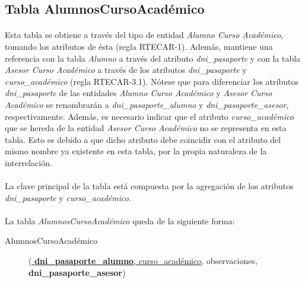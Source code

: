    \subsection{Tabla AlumnosCursoAcadémico}

      \paragraph{}Esta tabla se obtiene a través del tipo de entidad
      \textit{Alumno Curso Académico}, tomando los atributos de ésta (regla
      RTECAR-1). Además, mantiene una referencia con la tabla \textit{Alumno} a
      través del atributo \textit{dni\_pasaporte} y con la
      tabla \textit{Asesor Curso Académico} a través de los atributos
      \textit{dni\_pasaporte} y \textit{curso\_académico} (regla RTECAR-3.1).
      Nótese que para diferenciar los atributos \textit{dni\_pasaporte} de las
      entidades \textit{Alumno Curso Académico} y \textit{Asesor Curso
      Académico} se renombrarán a \textit{dni\_pasaporte\_alumno} y
      \textit{dni\_pasaporte\_asesor}, respectivamente. Además, es necesario
      indicar que el atributo \textit{curso\_académico} que se hereda de la
      entidad \textit{Asesor Curso Académico} no se representa en esta tabla.
      Esto es debido a que dicho atributo debe coincidir con el atributo del
      mismo nombre ya existente en esta tabla, por la propia naturaleza de la
      interrelación.

      \paragraph{}La clave principal de la tabla está compuesta por la
      agregación de los atributos \textit{dni\_pasaporte} y
      \textit{curso\_académico}.

      \paragraph{}La tabla \textit{AlumnosCursoAcadémico} queda de la siguiente
      forma:

      \begin{description}
         \item[AlumnosCursoAcadémico] \begin{flushleft}(\underline{
         \textbf{dni\_pasaporte\_alumno}, curso\_académico}, observaciones,
         \textbf{dni\_pasaporte\_asesor})\end{flushleft}
      \end{description}
